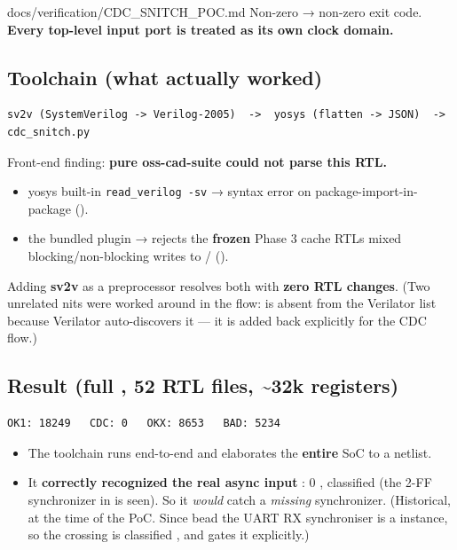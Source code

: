 \begin{relocated}{docs/verification/CDC_SNITCH_POC.md}
Non-zero  → non-zero exit code. \textbf{Every top-level input
port is treated as its own clock domain.}

\subsection{Toolchain (what actually worked)}\label{tm:flow:cdc-snitch-poc:toolchain-what-actually-worked}

\begin{lstlisting}[language={}]
sv2v (SystemVerilog -> Verilog-2005)  ->  yosys (flatten -> JSON)  ->  cdc_snitch.py
\end{lstlisting}

Front-end finding: \textbf{pure oss-cad-suite could not parse this RTL.}

\begin{itemize}
\tightlist
\item
  yosys built-in \texttt{read\_\allowbreak{}verilog\ -\allowbreak{}sv} →
  syntax error on package-import-in-package
  ().
\item
  the bundled  plugin → rejects the \textbf{frozen} Phase 3
  cache RTL\textquotesingle s mixed blocking/\allowbreak{}non-blocking
  writes to /
  ().
\end{itemize}

Adding \textbf{sv2v} as a preprocessor resolves both with \textbf{zero
RTL changes}. (Two unrelated nits were worked around in the flow:
 is absent from the Verilator
 list because Verilator auto-discovers it --- it
is added back explicitly for the CDC flow.)

\subsection{\texorpdfstring{Result (full , 52 RTL files,
\textasciitilde32k
registers)}{Result (full , 52 RTL files, \textasciitilde32k registers)}}\label{tm:flow:cdc-snitch-poc:result-full-soc-top-52-rtl-files-32k-registers}

\begin{lstlisting}[language={}]
OK1: 18249   CDC: 0   OKX: 8653   BAD: 5234
\end{lstlisting}

\begin{itemize}
\tightlist
\item
  \ok{} The toolchain runs end-to-end and elaborates the \textbf{entire}
  SoC to a netlist.
\item
  \ok{} It \textbf{correctly recognized the real async input}
  : 0 , classified  (the 2-FF
  synchronizer in  is seen). So it \emph{would}
  catch a \emph{missing} synchronizer. (Historical, at the time of the
  PoC. Since bead  the UART RX synchroniser is a
   instance, so the crossing is classified ,
  and   gates
  it explicitly.)
\end{itemize}


\end{relocated}
